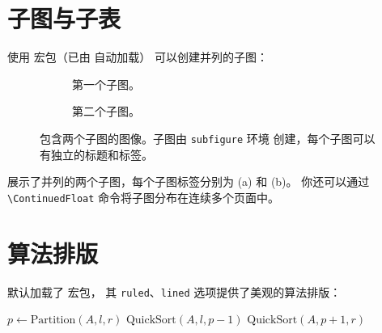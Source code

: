 \section{子图与子表}

使用  宏包（已由  自动加载）
可以创建并列的子图：

\begin{figure}[h!]
    \centering
    \begin{subfigure}[b]{0.45\textwidth}
        \centering
        \caption{第一个子图。}
    \end{subfigure}
    \hfill
    \begin{subfigure}[b]{0.45\textwidth}
        \centering
        \caption{第二个子图。}
    \end{subfigure}
    \caption[子图示例]{包含两个子图的图像。子图由 \texttt{subfigure} 环境
    创建，每个子图可以有独立的标题和标签。}
\end{figure}


 展示了并列的两个子图，每个子图标签分别为 (a) 和 (b)。
你还可以通过 \lstinline|\ContinuedFloat| 命令将子图分布在连续多个页面中。

\section{算法排版}

 默认加载了  宏包，
其 \texttt{ruled}、\texttt{lined} 选项提供了美观的算法排版：

\begin{algorithm}[H]
    \SetAlgoLined
    \caption{快速排序（Quick Sort）}
    $p \gets \text{Partition}(A, l, r)$\;
    $\text{QuickSort}(A, l, p-1)$\;
    $\text{QuickSort}(A, p+1, r)$\;
\end{algorithm}

